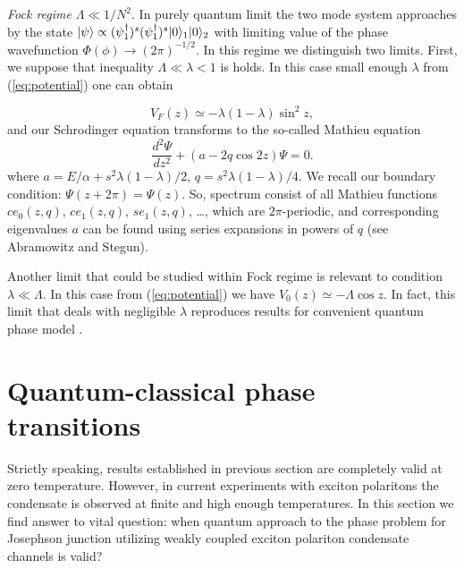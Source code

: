 \documentclass[aps, pre, preprint, groupedaddress, superscriptaddress, showkeys, showpacs] {revtex4-1}
\DeclarePairedDelimiter\ket{\lvert}{\rangle}
\begin{document}
\textit{Fock regime} $\Lambda \ll 1/N^2$.
In purely quantum limit the two mode system approaches by the state $\ket{\psi} \propto (\psi_1^\dag)^s (\psi_1^\dag)^s \ket{0}_1 \ket{0}_2$ with limiting value of the phase wavefunction $\Phi(\phi) \to (2\pi)^{-1/2}$.
In this regime we distinguish two limits.
First, we suppose that inequality $\Lambda \ll \lambda < 1$ is holds.
In this case small enough $\lambda$ from (\ref{eq:potential}) one can obtain
%
{\red

%
\begin{equation}
V_F(z) \simeq -\lambda (1 - \lambda) \sin^2{z},
\end{equation}
%
and our Schrodinger equation transforms to the so-called Mathieu equation
%
\begin{equation}
\frac{d^2 \Psi}{d z^2} + (a - 2q  \cos{2z}) \Psi = 0.
\end{equation}
%
where $a = E / \alpha + s^2 \lambda(1 - \lambda) / 2$, $q = s^2 \lambda (1 - \lambda)/ 4$.
We recall our boundary condition: $\Psi(z + 2\pi) = \Psi(z)$.
So, spectrum consist of all Mathieu functions $ce_0(z, q)$, $ce_1(z, q)$, $se_1(z, q)$, \dots, which are $2\pi$-periodic, and corresponding eigenvalues $a$ can be found using series expansions in powers of $q$ (see Abramowitz and Stegun). 
}

Another limit that could be studied within Fock regime is relevant to condition $\lambda \ll \Lambda$. In this case from (\ref{eq:potential}) we have $V_0(z) \simeq -\Lambda \cos{z}$.
In fact, this limit that deals with negligible $\lambda$ reproduces results for convenient quantum phase model \cite{Anglin}.


\section{Quantum-classical phase transitions \label{sec:quantum_classical}}

Strictly speaking, results established in previous section are completely valid at zero temperature. However, in current experiments with exciton polaritons  the condensate is observed at finite and high enough temperatures.
In this section we find answer to vital question: when quantum approach to the phase problem for Josephson junction utilizing weakly coupled exciton polariton condensate channels is valid?
\end{document}
